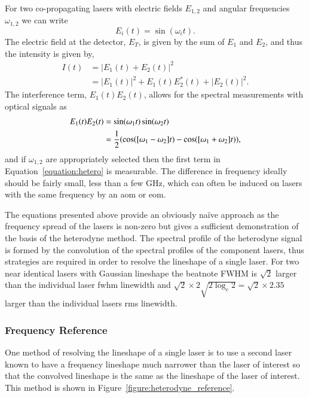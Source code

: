 For two co-propagating lasers with electric fields $E_{1, 2}$ and angular frequencies $\omega_{1, 2}$ we can write
\begin{equation}
E_{i}(t) = \sin(\omega_{i}t).
\end{equation}
The electric field at the detector, $E_T$, is given by the sum of $E_{1}$ and $E_{2}$, and thus the intensity is given by,
\begin{align}
I(t) &= |E_1(t) + E_2(t)|^2\nonumber\\
&= |E_1(t)|^2 + E_1(t)E_2^*(t) + |E_2(t)|^2.
\end{align}
The interference term, $E_1(t)E_2(t)$, allows for the spectral measurements with optical signals as
\begin{align}
E_1(t)E_2(t) &= \sin(\omega_1 t) \sin(\omega_2 t) \notag \\
&= \frac{1}{2} (\cos([\omega_1-\omega_2]t) - \cos([\omega_1+\omega_2]t)), \label{equation:hetero}
\end{align}
and if $\omega_{1,2}$ are appropriately selected then the first term in Equation~\ref{equation:hetero} is measurable.
The difference in frequency ideally should be fairly small, less than a few GHz, which can often be induced on lasers with the same frequency by an \gls{aom} or \gls{eom}.

The equations presented above provide an obviously na\"ive approach as the frequency spread of the lasers is non-zero but gives a sufficient demonstration of the basis of the heterodyne method.
The spectral profile of the heterodyne signal is formed by the convolution of the spectral profiles of the component lasers, thus strategies are required in order to resolve the lineshape of a single laser.
For two near identical lasers with Gaussian lineshape the beatnote \gls{FWHM} is $\sqrt{2}$ larger than the individual laser \gls{fwhm} linewidth and $\sqrt{2}\times2\sqrt{2\log_e2}=\sqrt{2}\times2.35$ larger than the individual lasers \gls{rms} linewidth.

\subsubsection{Frequency Reference}
One method of resolving the lineshape of a single laser is to use a second laser known to have a frequency lineshape much narrower than the laser of interest so that the convolved lineshape is the same as the lineshape of the laser of interest.
This method is shown in Figure~\ref{figure:heterodyne_reference}.

